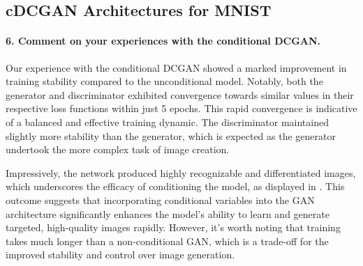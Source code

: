 \subsection{cDCGAN Architectures for MNIST}

\paragraph*{6. Comment on your experiences with the conditional DCGAN.}

Our experience with the conditional DCGAN showed a marked improvement in training stability compared to the unconditional model. Notably, both the generator and discriminator exhibited convergence towards similar values in their respective loss functions within just 5 epochs. This rapid convergence is indicative of a balanced and effective training dynamic. The discriminator maintained slightly more stability than the generator, which is expected as the generator undertook the more complex task of image creation. 

Impressively, the network produced highly recognizable and differentiated images, which underscores the efficacy of conditioning the model, as displayed in . This outcome suggests that incorporating conditional variables into the GAN architecture significantly enhances the model's ability to learn and generate targeted, high-quality images rapidly. However, it's worth noting that training takes much longer than a non-conditional GAN, which is a trade-off for the improved stability and control over image generation.

